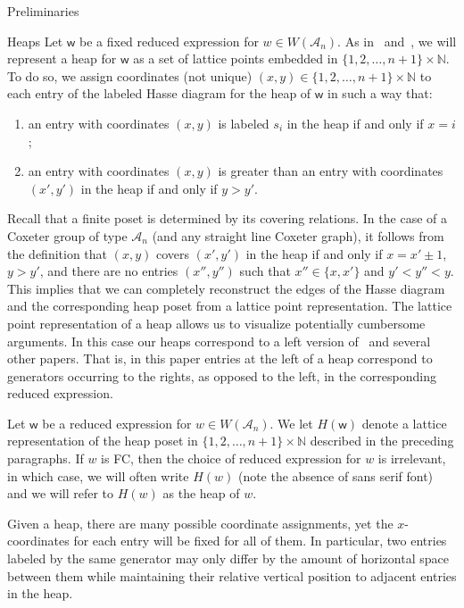\documentclass[11pt]{amsart}
\theoremstyle{definition}
\numberwithin{equation}{section}
\newcommand{\N}{\mathbb{N}}
\newcommand{\A}{\mathcal{A}}
\renewcommand{\(}{\left(}
\renewcommand{\)}{\right)}
\newcommand{\w}{\mathsf{w}}
\begin{document}
\begin{section}{Preliminaries}
\begin{subsection}{Heaps}
Let $\w$ be a fixed reduced expression for $w \in W(\A_{n})$.  As in~\cite{Billey2007} and~\cite{Ernst2010}, we will represent a heap for $\w$ as a set of lattice points embedded in $\{1,2,\ldots,n+1\} \times \mathbb{N}$.  To do so, we assign coordinates (not unique) $(x,y) \in \{1,2,\ldots, n+1\} \times \mathbb{N}$ to each entry of the labeled Hasse diagram for the heap of $\w$ in such a way that:
\begin{enumerate}
\item an entry with coordinates $(x,y)$ is labeled $s_i$ in the heap if and only if $x = i$; 
\item an entry with coordinates $(x,y)$ is greater than an entry with coordinates $(x',y')$ in the heap if and only if $y > y'$.
\end{enumerate}
Recall that a finite poset is determined by its covering relations.  In the case of a Coxeter group of type $\A_{n}$ (and any straight line Coxeter graph), it follows from the definition that $(x,y)$ covers $(x',y')$ in the heap if and only if $x = x' \pm 1$, $y > y'$, and there are no entries $(x'', y'')$ such that $x'' \in \{x, x'\}$ and $y'< y'' < y$.  This implies that we can completely reconstruct the edges of the Hasse diagram and the corresponding heap poset from a lattice point representation. The lattice point representation of a heap allows us to visualize potentially cumbersome arguments.  In this case our heaps correspond to a left version of~\cite{Billey2007} and several other papers.  That is, in this paper entries at the left of a heap correspond to generators occurring to the rights, as opposed to the left, in the corresponding reduced expression. 

Let $\w$ be a reduced expression for $w \in W(\A_{n})$.  We let $H(\w)$ denote a lattice representation of the heap poset in $\{1,2,\ldots,n+1\} \times \N$ described in the preceding paragraphs.  
If $w$ is FC, then the choice of reduced expression for $w$ is irrelevant, in which case, we will often write $H(w)$ (note the absence of \textsf{sans serif} font) and we will refer to $H(w)$ as the heap of $w$.

Given a heap, there are many possible coordinate assignments, yet the $x$-coordinates for each entry will be fixed for all of them.  In particular, two entries labeled by the same generator may only differ by the amount of horizontal space between them while maintaining their relative vertical position to adjacent entries in the heap.


\end{subsection}
\end{section}
\end{document}
